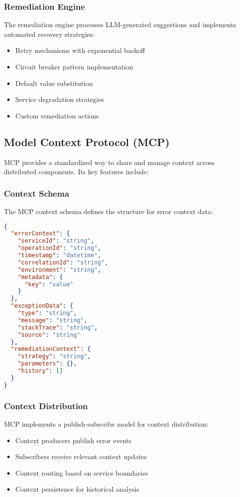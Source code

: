 \subsubsection{Remediation Engine}
The remediation engine processes LLM-generated suggestions and implements automated recovery strategies:

\begin{itemize}
    \item Retry mechanisms with exponential backoff
    \item Circuit breaker pattern implementation
    \item Default value substitution
    \item Service degradation strategies
    \item Custom remediation actions
\end{itemize}

\subsection{Model Context Protocol (MCP)}
MCP provides a standardized way to share and manage context across distributed components. Its key features include:

\subsubsection{Context Schema}
The MCP context schema defines the structure for error context data:

\begin{lstlisting}[language=json]
{
  "errorContext": {
    "serviceId": "string",
    "operationId": "string",
    "timestamp": "datetime",
    "correlationId": "string",
    "environment": "string",
    "metadata": {
      "key": "value"
    }
  },
  "exceptionData": {
    "type": "string",
    "message": "string",
    "stackTrace": "string",
    "source": "string"
  },
  "remediationContext": {
    "strategy": "string",
    "parameters": {},
    "history": []
  }
}
\end{lstlisting}

\subsubsection{Context Distribution}
MCP implements a publish-subscribe model for context distribution:

\begin{itemize}
    \item Context producers publish error events
    \item Subscribers receive relevant context updates
    \item Context routing based on service boundaries
    \item Context persistence for historical analysis
\end{itemize}

